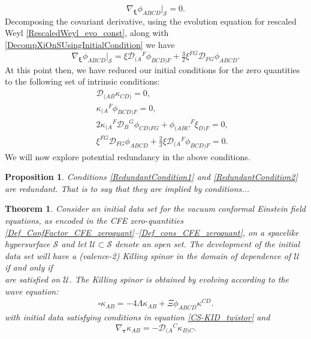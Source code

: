 \documentclass[10pt,a4paper]{article}
\theoremstyle{plain}
\newtheorem{proposition}{Proposition}
\newtheorem{theorem}{Theorem}
\begin{document}
\[ \nabla_{\bm\xi}\phi_{ABCD}\big\vert_{\mathcal{S}}=0.\]
Decomposing the covariant derivative, using the evolution equation for rescaled Weyl \eqref{RescaledWeyl_evo_const}, along with \eqref{DecompXiOnSUsingInitialCondition} we have 
\[ \nabla_{\bm\xi}\phi_{ABCD}\big\vert_{\mathcal{S}} =  \xi \mathcal{D}_{(A}{}^{F}\phi_{BCD)F} + \tfrac{3}{2} \xi^{FG} \mathcal{D}_{FG}\phi_{ABCD}. \]
At this point then, we have reduced our initial conditions for the zero quantities to the following set of intrinsic conditions:
\begin{subequations}
\begin{eqnarray}
    && \mathcal{D}_{(AB}\kappa_{CD)}=0,\\
    && \kappa_{(A}{}^F\phi_{BCD)F}=0,\\
    && 2 \kappa_{(A}{}^{F}\mathcal{D}_{B}{}^{G}\phi_{CD)FG} + \phi_{(ABC}{}^{F}\xi_{D)F} = 0,\label{RedundantCondition1}\\
    && \xi^{FG}\mathcal{D}_{FG}\phi_{ABCD} + \tfrac{2}{3}\xi\mathcal{D}_{(A}{}^F\phi_{BCD)F} = 0. \label{RedundantCondition2}
\end{eqnarray}
\end{subequations}
We will now explore potential redundancy in the above conditions. 

\begin{proposition}
Conditions \eqref{RedundantCondition1} and \eqref{RedundantCondition2} are redundant. That is to say that they are implied by conditions...
\end{proposition}

\begin{theorem}\label{Theorem_KS}
Consider an initial data set for the vacuum conformal Einstein
field equations, as encoded in the CFE zero-quantities
\eqref{Def_ConfFactor_CFE_zeroquant}--\eqref{Def_cons_CFE_zeroquant},
on a spacelike hypersurface $\mathcal{S}$ and let
$\mathcal{U}\subset\mathcal{S}$ denote an open set.
The development
of the initial data set will have a
(valence-2) Killing spinor in the domain of
dependence of $\mathcal{U}$ if and only if
\\

are satisfied on $\mathcal{U}$. The Killing spinor is obtained by 
evolving according to the wave equation:
\begin{align} \label{Wave_eq_KS_theo}
\square \kappa _{AB} = -4 \Lambda \kappa _{AB} + \Xi \phi_{ABCD}\kappa^{CD}.
\end{align}
with initial data satisfying conditions in equation
\eqref{CS-KID_twistor} and
\begin{equation}
  \nabla_{\bm\tau} \kappa _{AB} = -\mathcal{D} _{(A}{}^C \kappa_{B)C}.
\end{equation}
\end{theorem}
\end{document}
